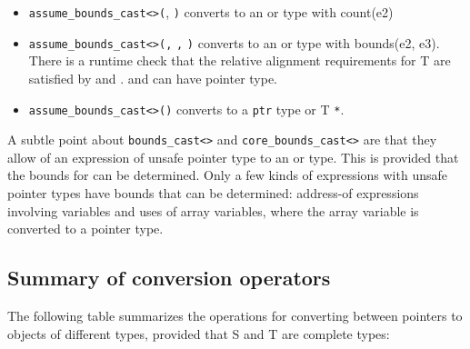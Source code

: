 \begin{itemize}
\item
  \texttt{assume\_bounds\_cast\textless{}}\texttt{\textgreater{}(},
  \texttt{)} converts  to an \arrayptr or
  \arrayview type with count(e2)
\item
  \texttt{assume\_bounds\_cast\textless{}}\texttt{\textgreater{}(}\texttt{,}
  \texttt{,} \texttt{)} converts  to an
  \arrayptr or \arrayview type with bounds(e2, e3).
  There is a runtime check that the relative alignment requirements for
  T are satisfied by   and .  and
   can have pointer type.
\item
  \texttt{assume\_bounds\_cast\textless{}}\texttt{\textgreater{}(}\texttt{)}
  converts  to a \texttt{ptr} type or T \texttt{*}.
\end{itemize}

A subtle point about
\texttt{bounds\_cast\textless{}}\texttt{\textgreater{}} and
\texttt{core\_bounds\_cast\textless{}}\texttt{\textgreater{}}
are that they allow  of an expression
 of unsafe pointer type to an \arrayview or
\arrayptr type. This is provided that the bounds for 
can be determined. Only a few kinds of expressions with unsafe pointer
types have bounds that can be determined: address-of expressions
involving variables and uses of array variables, where the array
variable is converted to a pointer type.

\subsection{Summary of conversion operators}
\label{summary-of-conversion-operators}

The following table summarizes the operations for converting between
pointers to objects of different types, provided that S and T are
complete types:

